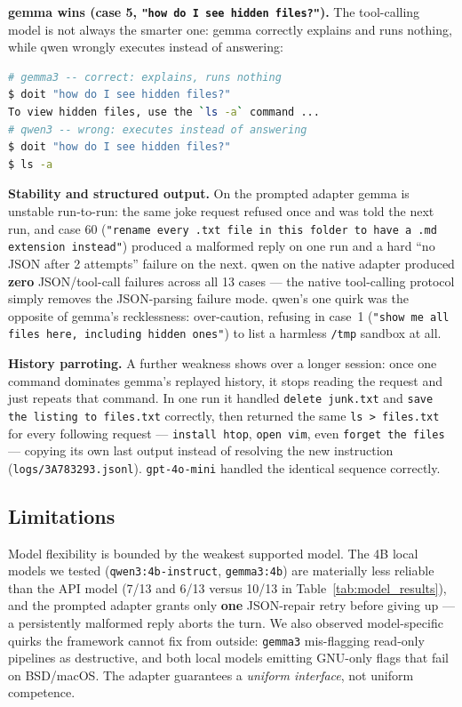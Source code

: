 \documentclass[11pt,a4paper]{article}
\begin{document}
\textbf{gemma wins (case 5, \texttt{"how do I see hidden files?"}).} The tool-calling model is not always the smarter one: gemma correctly explains and runs nothing, while qwen wrongly executes instead of answering:
\begin{lstlisting}[language=bash, caption={gemma answers the question; qwen runs a command it should not.}]
# gemma3 -- correct: explains, runs nothing
$ doit "how do I see hidden files?"
To view hidden files, use the `ls -a` command ...
# qwen3 -- wrong: executes instead of answering
$ doit "how do I see hidden files?"
$ ls -a
\end{lstlisting}

\textbf{Stability and structured output.} On the prompted adapter gemma is unstable run-to-run: the same joke request refused once and was told the next run, and case 60 (\texttt{"rename every .txt file in this folder to have a .md extension instead"}) produced a malformed reply on one run and a hard ``no JSON after 2 attempts'' failure on the next. qwen on the native adapter produced \textbf{zero} JSON/tool-call failures across all 13 cases --- the native tool-calling protocol simply removes the JSON-parsing failure mode. qwen's one quirk was the opposite of gemma's recklessness: over-caution, refusing in case~1 (\texttt{"show me all files here, including hidden ones"}) to list a harmless \texttt{/tmp} sandbox at all.

\textbf{History parroting.} A further weakness shows over a longer session: once one command dominates gemma's replayed history, it stops reading the request and just repeats that command. In one run it handled \texttt{delete junk.txt} and \texttt{save the listing to files.txt} correctly, then returned the same \texttt{ls > files.txt} for every following request --- \texttt{install htop}, \texttt{open vim}, even \texttt{forget the files} --- copying its own last output instead of resolving the new instruction (\texttt{logs/3A783293.jsonl}). \texttt{gpt-4o-mini} handled the identical sequence correctly.

\subsection{Limitations}
Model flexibility is bounded by the weakest supported model. The 4B local models we tested (\texttt{qwen3:4b-instruct}, \texttt{gemma3:4b}) are materially less reliable than the API model (7/13 and 6/13 versus 10/13 in Table~\ref{tab:model_results}), and the prompted adapter grants only \textbf{one} JSON-repair retry before giving up --- a persistently malformed reply aborts the turn. We also observed model-specific quirks the framework cannot fix from outside: \texttt{gemma3} mis-flagging read-only pipelines as destructive, and both local models emitting GNU-only flags that fail on BSD/macOS. The adapter guarantees a \emph{uniform interface}, not uniform competence.
\end{document}
